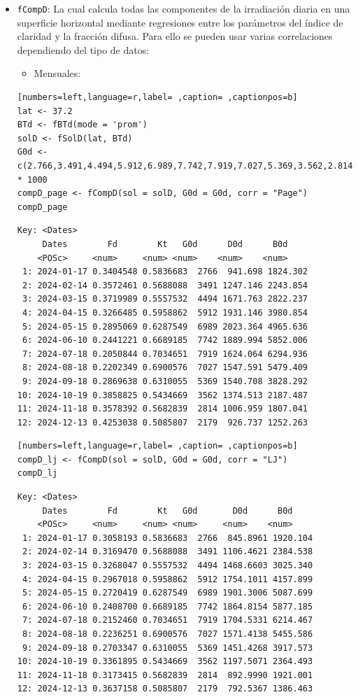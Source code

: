 \begin{itemize}
\item \texttt{fCompD}: La cual calcula todas las componentes de la irradiación diaria en una superficie horizontal mediante regresiones entre los parámetros del índice de claridad y la fracción difusa.
Para ello se pueden usar varias correlaciones dependiendo del tipo de datos:
\begin{itemize}
\item Mensuales:
\end{itemize}
\begin{lstlisting}[numbers=left,language=r,label= ,caption= ,captionpos=b]
lat <- 37.2
BTd <- fBTd(mode = 'prom')
solD <- fSolD(lat, BTd)
G0d <- c(2.766,3.491,4.494,5.912,6.989,7.742,7.919,7.027,5.369,3.562,2.814,2.179) * 1000
compD_page <- fCompD(sol = solD, G0d = G0d, corr = "Page")
compD_page
\end{lstlisting}

\begin{verbatim}
Key: <Dates>
	 Dates        Fd        Kt   G0d      D0d      B0d
	<POSc>     <num>     <num> <num>    <num>    <num>
 1: 2024-01-17 0.3404548 0.5836683  2766  941.698 1824.302
 2: 2024-02-14 0.3572461 0.5688088  3491 1247.146 2243.854
 3: 2024-03-15 0.3719989 0.5557532  4494 1671.763 2822.237
 4: 2024-04-15 0.3266485 0.5958862  5912 1931.146 3980.854
 5: 2024-05-15 0.2895069 0.6287549  6989 2023.364 4965.636
 6: 2024-06-10 0.2441221 0.6689185  7742 1889.994 5852.006
 7: 2024-07-18 0.2050844 0.7034651  7919 1624.064 6294.936
 8: 2024-08-18 0.2202349 0.6900576  7027 1547.591 5479.409
 9: 2024-09-18 0.2869638 0.6310055  5369 1540.708 3828.292
10: 2024-10-19 0.3858825 0.5434669  3562 1374.513 2187.487
11: 2024-11-18 0.3578392 0.5682839  2814 1006.959 1807.041
12: 2024-12-13 0.4253038 0.5085807  2179  926.737 1252.263
\end{verbatim}

\begin{lstlisting}[numbers=left,language=r,label= ,caption= ,captionpos=b]
compD_lj <- fCompD(sol = solD, G0d = G0d, corr = "LJ")
compD_lj
\end{lstlisting}

\begin{verbatim}
Key: <Dates>
	 Dates        Fd        Kt   G0d       D0d      B0d
	<POSc>     <num>     <num> <num>     <num>    <num>
 1: 2024-01-17 0.3058193 0.5836683  2766  845.8961 1920.104
 2: 2024-02-14 0.3169470 0.5688088  3491 1106.4621 2384.538
 3: 2024-03-15 0.3268047 0.5557532  4494 1468.6603 3025.340
 4: 2024-04-15 0.2967018 0.5958862  5912 1754.1011 4157.899
 5: 2024-05-15 0.2720419 0.6287549  6989 1901.3006 5087.699
 6: 2024-06-10 0.2408700 0.6689185  7742 1864.8154 5877.185
 7: 2024-07-18 0.2152460 0.7034651  7919 1704.5331 6214.467
 8: 2024-08-18 0.2236251 0.6900576  7027 1571.4138 5455.586
 9: 2024-09-18 0.2703347 0.6310055  5369 1451.4268 3917.573
10: 2024-10-19 0.3361895 0.5434669  3562 1197.5071 2364.493
11: 2024-11-18 0.3173415 0.5682839  2814  892.9990 1921.001
12: 2024-12-13 0.3637158 0.5085807  2179  792.5367 1386.463
\end{verbatim}


\end{itemize}
